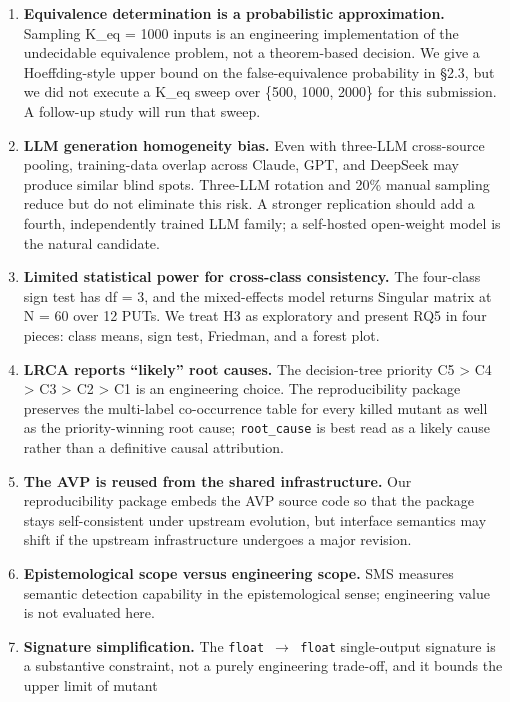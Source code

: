 \documentclass[manuscript,screen,review]{acmart}
\begin{document}
\begin{enumerate}[label=(\alph*)]
\item
  \textbf{Equivalence determination is a probabilistic approximation.}
  Sampling K\_eq = 1000 inputs is an engineering implementation of the
  undecidable equivalence problem, not a theorem-based decision. We give
  a Hoeffding-style upper bound on the false-equivalence probability in
  §2.3, but we did not execute a K\_eq sweep over \{500, 1000, 2000\}
  for this submission. A follow-up study will run that sweep.
\item
  \textbf{LLM generation homogeneity bias.} Even with three-LLM
  cross-source pooling, training-data overlap across Claude, GPT, and
  DeepSeek may produce similar blind spots. Three-LLM rotation and 20\%
  manual sampling reduce but do not eliminate this risk. A stronger
  replication should add a fourth, independently trained LLM family; a
  self-hosted open-weight model is the natural candidate.
\item
  \textbf{Limited statistical power for cross-class consistency.} The
  four-class sign test has df = 3, and the mixed-effects model returns
  Singular matrix at N = 60 over 12 PUTs. We treat H3 as exploratory and
  present RQ5 in four pieces: class means, sign test, Friedman, and a
  forest plot.
\item
  \textbf{LRCA reports ``likely'' root causes.} The decision-tree
  priority C5 \textgreater{} C4 \textgreater{} C3 \textgreater{} C2
  \textgreater{} C1 is an engineering choice. The reproducibility
  package preserves the multi-label co-occurrence table for every killed
  mutant as well as the priority-winning root cause; \texttt{root\_cause}
  is best read as a likely cause rather than a definitive causal
  attribution.
\item
  \textbf{The AVP is reused from the shared infrastructure.} Our reproducibility package
  embeds the AVP source code so that the package stays self-consistent under upstream
  evolution, but interface semantics may shift if the upstream infrastructure undergoes a major
  revision.
\item
  \textbf{Epistemological scope versus engineering scope.} SMS measures
  semantic detection capability in the epistemological sense;
  engineering value is not evaluated here.
\item
  \textbf{Signature simplification.} The \texttt{float\ $\to$\ float}
  single-output signature is a substantive constraint, not a purely
  engineering trade-off, and it bounds the upper limit of mutant

\end{enumerate}
\end{document}
